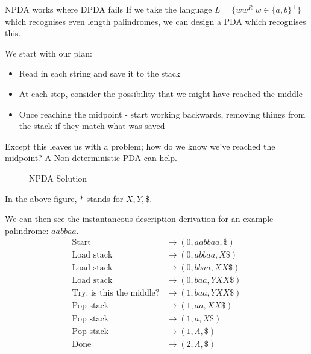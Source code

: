 \begin{example}{NPDA works where DPDA fails}
If we take the language $L=\{ww^R | w \in \{a, b\}^+\}$ which recognises even length palindromes, we can design a PDA which recognises this.

We start with our plan:
\begin{itemize}
    \item Read in each string and save it to the stack
    \item At each step, consider the possibility that we might have reached the middle
    \item Once reaching the midpoint - start working backwards, removing things from the stack if they match what was saved
\end{itemize}
Except this leaves us with a problem; how do we know we've reached the midpoint? A Non-deterministic PDA can help.

\begin{figure}[H]
    \centering
    \caption{NPDA Solution}
\end{figure}
In the above figure, $*$ stands for $X, Y, \$$. 

We can then see the instantaneous description derivation for an example palindrome: $aabbaa$.
\begin{align*}
\textrm{Start} & \rightarrow (0,aabbaa,\$)\\
\textrm{Load\ stack} & \rightarrow (0, abbaa, X\$)\\
\textrm{Load\ stack} & \rightarrow (0, bbaa, XX\$)\\
\textrm{Load\ stack} & \rightarrow (0, baa, YXX\$)\\
\textrm{Try:\ is\ this\ the\ middle?} & \rightarrow (1, baa, YXX\$)\\
\textrm{Pop\ stack} & \rightarrow (1, aa, XX\$)\\
\textrm{Pop\ stack} & \rightarrow (1, a, X\$)\\
\textrm{Pop\ stack} & \rightarrow (1, \Lambda, \$)\\
\textrm{Done} & \rightarrow (2, \Lambda, \$)\\
\end{align*}

\end{example}

